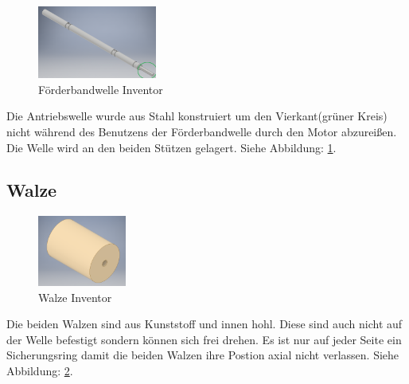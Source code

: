 \begin{figure}
\vspace{-20pt}
  \begin{center}
    \includegraphics[width=0.35\textwidth]{Bilder/Inventor/Antriebs_Welle_Foerderband}
  \end{center}
  \caption{Förderbandwelle Inventor}
  \label{Antriebs_Welle_Foerderband_Inventor}
  \vspace{-30pt}
\end{figure}

Die Antriebswelle wurde aus Stahl konstruiert um den Vierkant(grüner Kreis) nicht während des Benutzens der Förderbandwelle durch den Motor abzureißen. Die Welle wird an den beiden Stützen gelagert. Siehe Abbildung: \ref{Antriebs_Welle_Foerderband_Inventor}.\vspace{60pt}


\subsection{Walze}

\begin{figure}
\vspace{-20pt}
  \begin{center}
    \includegraphics[width=0.26\textwidth]{Bilder/Inventor/Rolle}
  \end{center}
  \caption{Walze Inventor}
  \label{Walze_Inventor}
  \vspace{-20pt}
\end{figure}

Die beiden Walzen sind aus Kunststoff und innen hohl. Diese sind auch nicht auf der Welle befestigt sondern können sich frei drehen. Es ist nur auf jeder Seite ein Sicherungsring damit die beiden Walzen ihre Postion axial nicht verlassen. Siehe Abbildung: \ref{Walze_Inventor}. \\
\newpage

